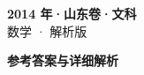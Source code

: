 \documentclass[zihao=-4, a4paper]{ctexart}
\begin{document}
\begin{center}
  {\Large\bfseries 2014 年·山东卷·文科}\\[4pt]
  {\large 数学 · 解析版}
\end{center}
\medskip
{}

\clearpage
{}
\begin{center}{\Large\bfseries 参考答案与详细解析}\end{center}
\medskip

\end{document}
